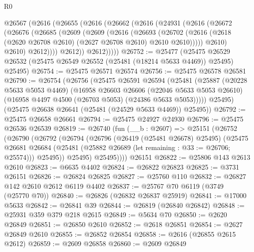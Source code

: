\begin{lexlean}{R0}
\begin{coremodule}
    @26567
      (@2616
        (@26655
          (@2616
            (@26662
              (@2616
                (@24931
                  (@2616
                    (@26672
                      (@26676
                        (@26685
                          (@2609
                            (@2609
                              (@2616
                                (@26693
                                  (@26702
                                    (@2616
                                      (@2618
                                        (@2620 @26708 @2610)
                                        (@2627 @26708 @2610)
                                        @2610
                                        @2610)))))
                              @2610)
                            @2610)
                          @2612))))
                  @2612))
              @2612)))))
@26752 := @25477
    (@25475 @26529 @26532 (@25475 @26549 @26552 (@25481 (@18214 @5633 @4469)) @25495) @25495)
@26754 := @25475 @26571 @26574
@26756 := @25475 @26578 @26581
@26790 := @26754
    (@26756
      (@25475
        @26591
        @26594
        (@25481
          (@25887
            (@20228 @5633 @5053 @4469)
            (@16958
              @26603
              @26606
              (@22046 @5633 @5053 @26610)
              (@16958 @4497 @4500 (@26703 @5053) (@24386 @5633 @5053)))))
        @25495)
      (@25475 @26638 @26641 (@25481 (@24529 @5633 @4469)) @25495))
@26792 := @25475 @26658 @26661
@26794 := @25475 @24927 @24930
@26796 := @25475 @26536 @26539
@26819 := @26740
    (fun (__b : @2607) =>
    @25151
      (@26752
        (@26790
          (@26792
            (@26794
              (@26796
                (@26419 (@25481 @26678) @25495)
                (@25475
                  @26681
                  @26684
                  (@25481 (@25882 @26689 (let remaining : @33 := @26706; @25574)))
                  @25495))
              @25495)
            @25495))))
    @26151
@26822 := @25806 @143 @2613 @2610
@26823 := @6635 @4402
@26824 := @26822 @26823
@26825 := @3731 @26151
@26826 := @26824 @26825
@26827 := @25760 @110
@26832 := @26827 @142 @2610 @2612 @6119 @4402
@26837 := @25767 @70 @6119 (@3749 (@25770 @70))
@26840 := @26826 (@26832 @26837 @25919)
@26841 := @17000 @5633
@26842 := @26841 @39
@26844 := @26819 (@26840 @26842)
@26848 := @25931 @359 @379 @218 @2615
@26849 := @5634 @70
@26850 := @2620 @26849
@26851 := @26850 @2610
@26852 := @2618 @26851
@26854 := @2627 @26849 @2610
@26855 := @26852 @26854
@26858 := @2616 (@26855 @2615 @2612)
@26859 := @2609 @26858
@26860 := @2609 @26849

\end{coremodule}
\end{lexlean}
